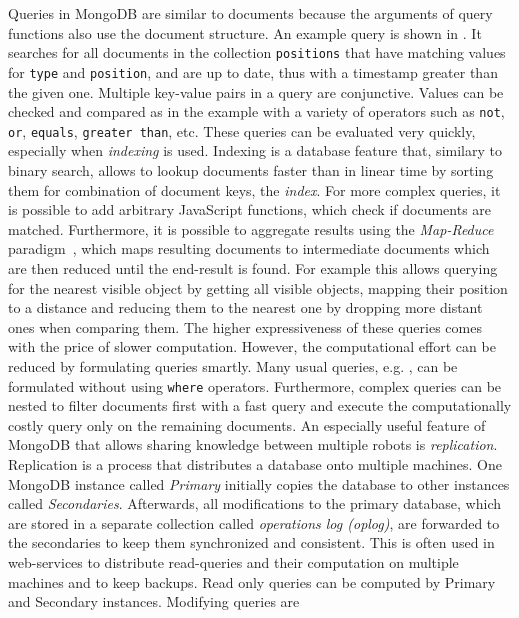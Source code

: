Queries in MongoDB are similar to documents because the arguments of
query functions also use the document structure. An example query is shown
in . It searches for all documents in the
collection \texttt{positions} that have matching values for
\texttt{type} and \texttt{position}, and are up to date, thus with a
timestamp greater than the given one. Multiple key-value pairs in a
query are conjunctive.  Values can be checked and compared as in the
example with a variety of operators such as \texttt{not}, \texttt{or},
\texttt{equals}, \texttt{greater than}, etc. These queries can be
evaluated very quickly, especially when \emph{indexing} is
used. Indexing is a
database feature that, similary to binary search, allows to lookup
documents faster than in linear time by sorting them for combination of document
keys, the \emph{index}. For more complex queries, it is possible to add arbitrary
JavaScript functions, which check if documents are matched.
Furthermore, it is possible to aggregate
results using the \emph{Map-Reduce} paradigm~\cite{mapreduce}, which
maps resulting documents to intermediate documents which are then
reduced until the end-result is found. For example this allows
querying for the nearest visible object by getting all visible
objects, mapping their position to a distance and reducing them to the
nearest one by dropping more distant ones when comparing them.
 The
higher expressiveness of these queries comes with the price of slower
computation. However, the computational effort can be reduced by
formulating queries smartly. Many usual queries,
e.g. , can be formulated without using
\texttt{where} operators. Furthermore, complex queries can be nested to
filter documents first with a fast query and execute the
computationally costly query only on the remaining documents.
%
An especially useful feature of MongoDB that allows sharing knowledge
between multiple robots is \emph{replication}. Replication is a
process that distributes a database onto multiple machines.  One
MongoDB instance called \emph{Primary} initially copies the database
to other instances called \emph{Secondaries}.  Afterwards, all
modifications to the primary database, which are stored in a separate
collection called \emph{operations log (oplog)}, are forwarded to the
secondaries to keep them synchronized and consistent.  This is often
used in web-services to distribute read-queries and their computation
on multiple machines and to keep backups.  Read only queries can be
computed by Primary and Secondary instances. Modifying queries are
